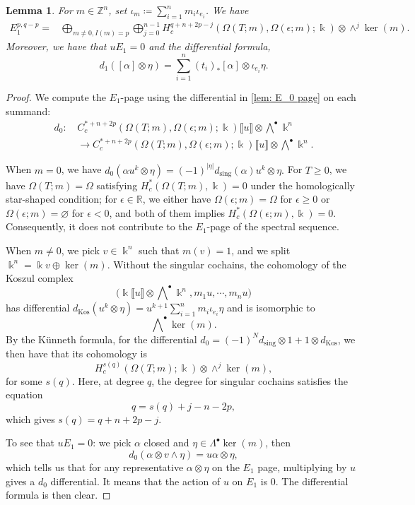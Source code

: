 \documentclass[11pt]{amsart}
\numberwithin{equation}{section}
\theoremstyle{plain}
\newtheorem{Lemma}[lemma]{Lemma}
\theoremstyle{definition}
\theoremstyle{remark}
\newcommand{\bZ} { {\mathbb{Z}}}
\newcommand{\bR} { {\mathbb{R}}}
\newcommand{\fpw}[1]{{\llbracket #1\rrbracket}}
\begin{document}
\begin{Lemma}\label{lem: E_1 page}For $m\in \bZ^n$, set $\iota_m\coloneqq \sum_{i=1}^n m_i \iota_{e_i} $. We have 
\begin{align*}
    E_1^{p,q-p}=&\bigoplus_{m\neq 0, I(m)= p} \bigoplus_{j=0}^{n-1}H^{q+n+2p-j}_c({\Omega(T;m)},{\Omega(\epsilon;m)} ;\Bbbk )   \otimes \wedge^j \ker(m).
\end{align*}
Moreover, we have that $u E_1=0$ and the differential formula, 
\[d_1([\alpha] \otimes \eta)= 
    \sum_{i=1}^n(t_i)_*[\alpha]\otimes \iota_{e_i}\eta
.\]
\end{Lemma}
\begin{proof}
We compute the $E_1$-page using the differential in \autoref{lem: E_0 page} on each summand:
\begin{align*}
d_0: & \,C_c^{*+n+2p}(\Omega(T; m), \Omega(\epsilon; m); \Bbbk)\fpw{u} \otimes \bigwedge\nolimits^\bullet \Bbbk^n \\
&\, \to C_c^{*+n+2p}(\Omega(T; m), \Omega(\epsilon; m); \Bbbk)\fpw{u} \otimes \bigwedge\nolimits^{\bullet} \Bbbk^n.\end{align*}

When $m=0$, we have 
\(d_0(\alpha u^k \otimes \eta) = (-1)^{|\eta|}d_{\mathrm{sing}}(\alpha)u^k \otimes \eta.\) 
For $T\geq 0$, we have $\Omega(T;m)=\Omega$ satisfying $H^*_c(\Omega(T;m),\Bbbk)= 0$ under the homologically star-shaped condition; for $\epsilon\in \bR$, we either have $\Omega(\epsilon;m)=\Omega$ for $\epsilon\geq 0$ or $\Omega(\epsilon;m)=\varnothing$ for $\epsilon<0$, and both of them implies $H^*_c(\Omega(\epsilon;m),\Bbbk)=0$. Consequently, it does not contribute to the $E_1$-page of the spectral sequence.

When $m\neq 0$, we pick $v\in \Bbbk^n$ such that $m(v)=1$, and we split $\Bbbk^n=\Bbbk v\oplus \ker (m)$. Without the singular cochains, the cohomology of the Koszul complex
\[\Big(\Bbbk\fpw{u} \otimes \bigwedge\nolimits^\bullet \Bbbk ^n,m_1 u, \cdots, m_n u\Big)\]
has differential $d_{\mathrm{Kos}}(u^k \otimes \eta) = u^{k+1} \sum_{i=1}^n m_i \iota_{e_i}\eta$ and is isomorphic to 
\[\bigwedge \nolimits^\bullet \ker(m).\]
By the Künneth formula, for the differential $d_0 = (-1)^{N}d_{\mathrm{sing}} \otimes 1 + 1 \otimes d_{\mathrm{Kos}}$, we then have that its cohomology is
\[H^{s(q)}_c({\Omega(T;m)} ;\Bbbk )   \otimes \wedge^j \ker(m),\]
for some $s(q)$. 
Here, at degree $q$, the degree for singular cochains satisfies the equation
\[q=s(q)+j-n-2p,\]
which gives $s(q)=q+n+2p-j$.

To see that $uE_1=0$: we pick $\alpha$ closed and $\eta\in\Lambda^\bullet\ker (m)$, then 
\[d_0(\alpha \otimes v\wedge \eta)=u \alpha\otimes \eta,\]
which tells us that for any representative $\alpha\otimes \eta$ on the $E_1$ page, multiplying by $u$ gives a $d_0$ differential. It means that the action of $ u$ on $E_1$ is $0$. The differential formula is then clear.
\end{proof}
 
\end{document}
